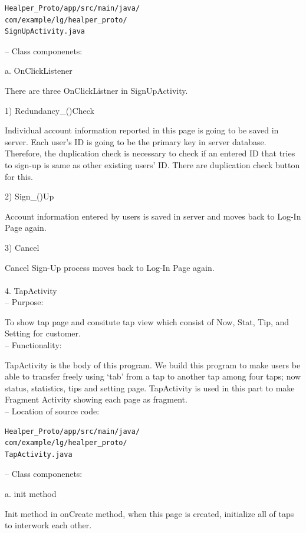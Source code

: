 \documentclass[conference]{IEEEtran}
\begin{document}
\begin{verbatim} 
Healper_Proto/app/src/main/java/
com/example/lg/healper_proto/
SignUpActivity.java
 \end{verbatim}
 
 --	Class componenets:

a. OnClickListener

There are three OnClickListner in SignUpActivity.

  1) Redundancy\_()Check

  Individual account information reported in this page is going to be saved in server. Each user’s ID is going to be the primary key in server database. Therefore, the duplication check is necessary to check if an entered ID that tries to sign-up is same as other existing users’ ID. There are duplication check button for this. 

  2) Sign\_()Up

  Account information entered by users is saved in server and moves back to Log-In Page again.

  3) Cancel

  Cancel Sign-Up process moves back to Log-In Page again.\\\\



4.	TapActivity\\
 
 --	Purpose:
 
To show tap page and consitute tap view which consist of Now, Stat, Tip, and Setting for customer.\\
 
 --	Functionality:

TapActivity is the body of this program. We build this program to make users be able to transfer freely using ‘tab’ from a tap to another tap among four taps; now status, statistics, tips and setting page. TapActivity is used in this part to make Fragment Activity showing each page as fragment.\\

 --	Location of source code:
 
\begin{verbatim}
Healper_Proto/app/src/main/java/
com/example/lg/healper_proto/
TapActivity.java
 \end{verbatim}
 
 --	Class componenets:

a. init method

Init method in onCreate method, when this page is created, initialize all of taps to interwork each other. 
\end{document}
